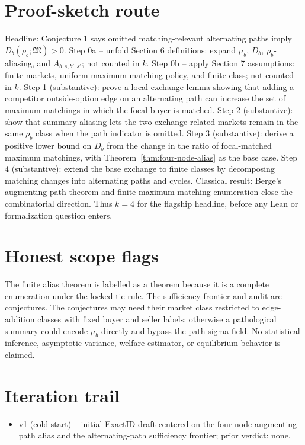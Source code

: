 \documentclass[11pt]{article}
\theoremstyle{definition}
\theoremstyle{plain}
\theoremstyle{remark}
\begin{document}
\section{Proof-sketch route}
Headline: Conjecture 1 says omitted matching-relevant alternating paths imply $D_b(\rho_b;\mathfrak M)>0$.
Step 0a -- unfold Section 6 definitions: expand $\mu_b$, $D_b$, $\rho_b$-aliasing, and $A_{b,s,b',s'}$; not counted in $k$.
Step 0b -- apply Section 7 assumptions: finite markets, uniform maximum-matching policy, and finite class; not counted in $k$.
Step 1 (substantive): prove a local exchange lemma showing that adding a competitor outside-option edge on an alternating path can increase the set of maximum matchings in which the focal buyer is matched.
Step 2 (substantive): show that summary aliasing lets the two exchange-related markets remain in the same $\rho_b$ class when the path indicator is omitted.
Step 3 (substantive): derive a positive lower bound on $D_b$ from the change in the ratio of focal-matched maximum matchings, with Theorem~\ref{thm:four-node-alias} as the base case.
Step 4 (substantive): extend the base exchange to finite classes by decomposing matching changes into alternating paths and cycles.
Classical result: Berge's augmenting-path theorem and finite maximum-matching enumeration close the combinatorial direction. Thus $k=4$ for the flagship headline, before any Lean or formalization question enters.

\section{Honest scope flags}
The finite alias theorem is labelled as a theorem because it is a complete enumeration under the locked tie rule. The sufficiency frontier and audit are conjectures. The conjectures may need their market class restricted to edge-addition classes with fixed buyer and seller labels; otherwise a pathological summary could encode $\mu_b$ directly and bypass the path sigma-field. No statistical inference, asymptotic variance, welfare estimator, or equilibrium behavior is claimed.

\section{Iteration trail}
\begin{itemize}[leftmargin=*]
\item v1 (cold-start) -- initial ExactID draft centered on the four-node augmenting-path alias and the alternating-path sufficiency frontier; prior verdict: none.
\end{itemize}
\end{document}

